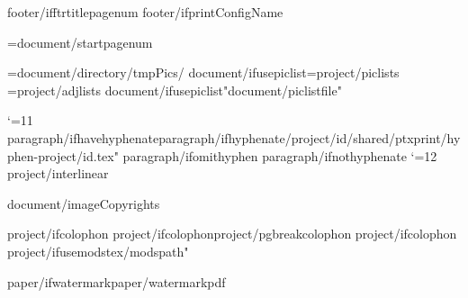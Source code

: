 {footer/ifftrtitlepagenum}\def\RFtitlecenter{{\pagenumber}}
{footer/ifprintConfigName}\def\RFtitlecenter{{{config/name}}}

\pageno={document/startpagenum}

\PicPath={{{document/directory}/tmpPics/}}
{document/ifusepiclist}\PicListPath={{{project/piclists}}}
\AdjListPath={{{project/adjlists}}}
{document/ifusepiclist}\openpiclist "{document/piclistfile}"

\catcode`\@=11
\def\b{{\the\p@rstylehooks \par\bgroup\s@tbaseline{{b}}\vskip\baselineskip\egroup}}
\newlanguage\langund \language\langund
{paragraph/ifhavehyphenate}{paragraph/ifhyphenate}\bgroup{}/{project/id}/shared/ptxprint/hyphen-{project/id}.tex" \egroup
{paragraph/ifomithyphen}
{paragraph/ifnothyphenate} 
\catcode`\@=12
\let\pb=\pagebreak
{project/interlinear}\expandafter\def\csname complex-rb\endcsname{{}}





{document/imageCopyrights}

{project/ifcolophon}\expandafter\def\csname bookend-final\endcsname{{
{project/ifcolophon}{project/pgbreakcolophon}\pb
{project/ifcolophon}\zcolophon}}
{project/ifusemodstex}{/modspath}"%


{paper/ifwatermark}{paper/watermarkpdf}

